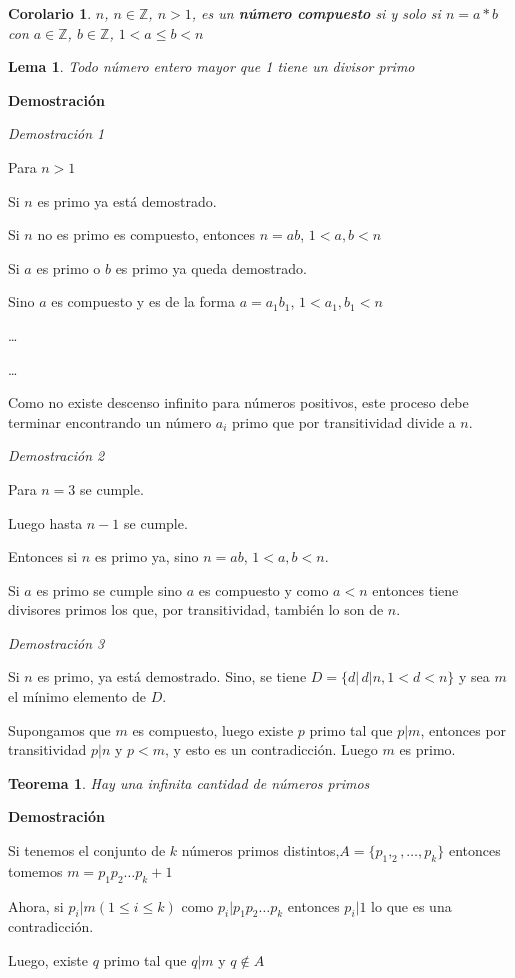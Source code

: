 \documentclass[a4paper,1pt]{report}
\newtheorem*{teo}{Teorema}
\newtheorem*{cor}{Corolario}
\newtheorem*{lem}{Lema}
\begin{document}
\begin{cor}
 $n$, $n\in\mathbb{Z}$, $n>1$, es un \textbf{número compuesto} si y solo si $n=a*b$ con $a\in\mathbb{Z}$, $b\in\mathbb{Z}$, $1<a\leq b < n$
\end{cor}

\begin{lem}
 Todo número entero mayor que 1 tiene un divisor primo
\end{lem}

\textbf{Demostración}

\textit{Demostración 1}

Para $n>1$

Si $n$ es primo ya está demostrado.

Si $n$ no es primo es compuesto, entonces $n=ab$, $1<a,b<n$

Si $a$ es primo o $b$ es primo ya queda demostrado.

Sino $a$ es compuesto y es de la forma $a=a_1b_1$, $1<a_1,b_1<n$

\dots

\dots

Como no existe descenso infinito para números positivos, este proceso debe terminar encontrando un número $a_i$ primo que por transitividad divide a $n$.

\textit{Demostración 2}

Para $n=3$ se cumple.

Luego hasta $n-1$ se cumple. 

Entonces si $n$ es primo ya, sino $n=ab$, $1<a,b<n$.

Si $a$ es primo se cumple sino $a$ es compuesto y como $a<n$ entonces tiene divisores primos los que, por transitividad, también lo son de $n$.

\textit{Demostración 3}

Si $n$ es primo, ya está demostrado.
Sino, se tiene $D=\{d|\, d|n, 1<d<n\}$ y sea $m$ el mínimo elemento de $D$. 

Supongamos que $m$ es compuesto, luego existe $p$ primo tal que $p|m$, entonces por transitividad $p|n$ y $p<m$, y esto es un contradicción. Luego $m$ es primo.

\begin{teo}
 Hay una infinita cantidad de números primos
\end{teo}

\textbf{Demostración}

Si tenemos el conjunto de $k$ números primos distintos,$A=\{p_1,_2,\dots ,p_k\}$
entonces tomemos $m=p_1p_2\dots p_k+1$

Ahora, si $p_i|m (1\leq i\leq k)$ como $p_i|p_1p_2\dots p_k$  entonces $p_i|1$ lo que es una contradicción.

Luego, existe $q$ primo tal que $q|m$ y $q\not\in A$
\end{document}
